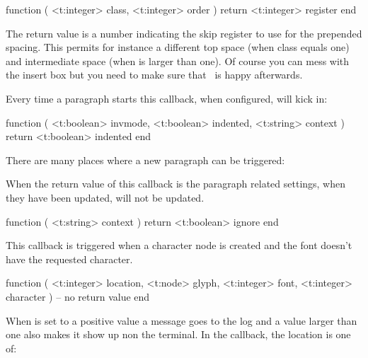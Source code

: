 \starttyping[option=LUA]
function (
    <t:integer> class,
    <t:integer> order
)
    return <t:integer> register
end
\stoptyping

The return value is a number indicating the skip register to use for the
prepended spacing. This permits for instance a different top space (when \type
{class} equals one) and intermediate space (when  is larger than
one). Of course you can mess with the insert box but you need to make sure that
\LUATEX\ is happy afterwards.

\stopsubsection

\startsubsection[title=begin_paragraph]

Every time a paragraph starts this callback, when configured, will kick in:

\starttyping[option=LUA]
function (
    <t:boolean> invmode,
    <t:boolean> indented,
    <t:string>  context
)
    return <t:boolean> indented
end
\stoptyping

There are many places where a new paragraph can be triggered:

\startfourrows
{}
\stopfourrows

\stopsubsection

\startsubsection[title=paragraph_context]

When the return value of this callback is  the paragraph related
settings, when they have been updated, will not be updated.

\starttyping[option=LUA]
function (
    <t:string> context
)
    return <t:boolean> ignore
end
\stoptyping

\stopsubsection

\startsubsection[title=missing_character]

This callback is triggered when a character node is created and the font doesn't
have the requested character.

\starttyping[option=LUA]
function (
    <t:integer> location,
    <t:node>    glyph,
    <t:integer> font,
    <t:integer> character
)
    -- no return value
end
\stoptyping

When  is set to a positive value a message goes to the log
and a value larger than one also makes it show up non the terminal. In the
callback, the location is one of:

\startfourrows
{}
\stopfourrows

\stopsubsection

